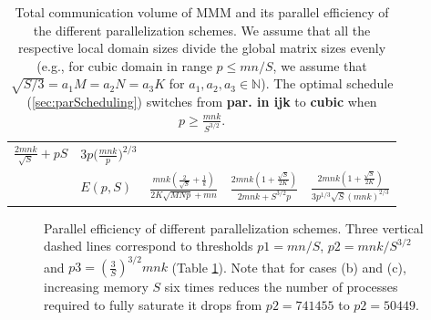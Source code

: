 \documentclass[sigplan,review,anonymous]{acmart}\settopmatter{printfolios=true,printccs=false,printacmref=false}
\begin{document}
\begin{table}[t]
\begin{tabular}{lllll}
    $\frac{2mnk}{\sqrt{S}} + pS$ & 
    $3p\big(\frac{mnk}{p}\big)^{2/3}$ 
    \\
    \cline{2-5}
    & $E(p,S)$ & $\frac{mnk(\frac{2}{\sqrt{S}} + 
    \frac{1}{k})}{2K\sqrt{MNp} 
      + mn}$ & $\frac{2mnk(1 + \frac{\sqrt{S}}{2K})}{2mnk + 
      S^{3/2}p}$ &   
    $\frac{2mnk(1 + 
    \frac{\sqrt{S}}{2K})}{3p^{1/3}\sqrt{S}(mnk)^{2/3}}$ \\
  \end{tabular}
  \caption{Total communication volume of MMM and its parallel 
  efficiency of 
  the 
  different parallelization schemes. We assume that all the 
  respective local 
  domain sizes divide the global matrix sizes evenly (e.g., for 
  cubic domain 
  in range $p \le mn/S$, we assume that $\sqrt{S/3} = a_1M = a_2N = 
  a_3K$ for 
  $a_1, a_2, a_3 \in \mathbb{N}$). The optimal schedule 
  (\cref{sec:parScheduling}) switches from \textbf{par. in ijk} to 
  \textbf{cubic} when $p \ge \frac{mnk}{S^{3/2}}$.}
  \label{tab:mmmEfficiency}
\end{table}


 \begin{figure}[t]
     \centering
   \hspace{-1cm}
   \hspace*{-1.5cm}
   \caption{Parallel 
   efficiency 
   of different parallelization schemes. Three vertical dashed lines 
   correspond to 
     thresholds 
     $p1 = mn/S$, $p2 = mnk/S^{3/2}$ and $p3 = 
     (\frac{3}{S})^{3/2}mnk$ (Table \ref{tab:mmmEfficiency}). Note 
     that for cases (b) and (c), increasing memory $S$ six times 
     reduces the number of processes required to fully saturate it 
     drops from $p2=741455$ to $p2=50449$. }
   \label{fig:mmmScaling}
 \end{figure}
\end{document}
